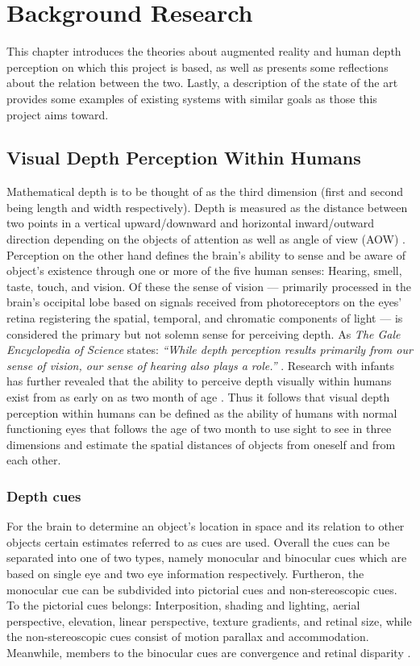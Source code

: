 \chapter{Background Research}\label{ch:backgroundresearch}
This chapter introduces the theories about augmented reality and human depth perception on which this project is based, as well as presents some reflections about the relation between the two. Lastly, a description of the state of the art provides some examples of existing systems with similar goals as those this project aims toward.

\section{Visual Depth Perception Within Humans}
Mathematical depth is to be thought of as the third dimension (first and second being length and width respectively). Depth is measured as the distance between two points in a vertical upward/downward and horizontal inward/outward direction depending on the objects of attention as well as angle of view (AOW) \cite{Gale}. Perception on the other hand defines the brain’s ability to sense and be aware of object’s existence through one or more of the five human senses: Hearing, smell, taste, touch, and vision. Of these the sense of vision --- primarily processed in the brain’s occipital lobe based on signals received from photoreceptors on the eyes’ retina registering the spatial, temporal, and chromatic components of light \cite{Spector2003} --- is considered the primary but not solemn sense for perceiving depth. As \textit{The Gale Encyclopedia of Science} states: \textit{“While depth perception results primarily from our sense of vision, our sense of hearing also plays a role.”} \cite{Gale}. Research with infants has further revealed that the ability to perceive depth visually within humans exist from as early on as two month of age \cite{Gale}. Thus it follows that visual depth perception within humans can be defined as the ability of humans with normal functioning eyes that follows the age of two month to use sight to see in three dimensions and estimate the spatial distances of objects from oneself and from each other.

\subsection{Depth cues}
For the brain to determine an object’s location in space and its relation to other objects certain estimates referred to as cues are used. Overall the cues can be separated into one of two types, namely monocular and binocular cues which are based on single eye and two eye information respectively. Furtheron, the monocular cue can be subdivided into pictorial cues and non-stereoscopic cues. To the pictorial cues belongs: Interposition, shading and lighting, aerial perspective, elevation, linear perspective, texture gradients, and retinal size, while the non-stereoscopic cues consist of motion parallax and accommodation. Meanwhile, members to the binocular cues are convergence and retinal disparity \cite{Gale}. 

